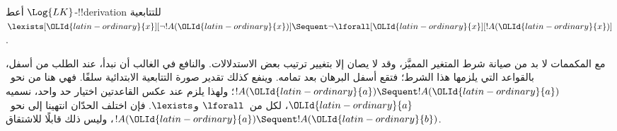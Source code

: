 \documentclass[../../../include/open-logic-section]{subfiles}
\begin{document}


\begin{ex}
أعط $\Log{LK}$-!!{derivation} للتتابعية
$\lexists[\OLId{latin-ordinary}{x}][\lnot !A(\OLId{latin-ordinary}{x})] \Sequent \lnot \lforall[\OLId{latin-ordinary}{x}][!A(\OLId{latin-ordinary}{x})]$.

مع المكممات لا بد من صيانة شرط المتغير المميَّز، وقد لا يصان إلا بتغيير ترتيب بعض الاستدلالات.
والنافع في الغالب أن نبدأ، عند الطلب من أسفل، بالقواعد التي يلزمها هذا الشرط؛ فتقع أسفل البرهان بعد تمامه.
وينفع كذلك تقدير صورة التتابعية الابتدائية سلفًا. فهي هنا من نحو~$!A(\OLId{latin-ordinary}{a}) \Sequent !A(\OLId{latin-ordinary}{a})$؛ ولهذا يلزم عند عكس القاعدتين اختيار حد واحد، نسميه
$\OLId{latin-ordinary}{a}$، لكل من~$\lforall$ و$\lexists$. فإن اختلف الحدّان انتهينا إلى نحو~$!A(\OLId{latin-ordinary}{a}) \Sequent !A(\OLId{latin-ordinary}{b})$، وليس ذلك قابلًا للاشتقاق.


\end{ex}
\end{document}
